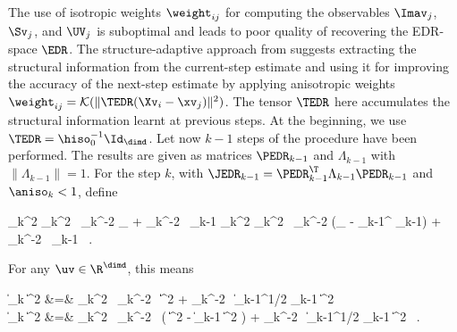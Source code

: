 \label{SEDRsa}
The use of isotropic weights \( \weight_{ij} \) for computing the observables 
\( \Imav_{j} \), \( \Sv_{j} \), and \( \UV_{j} \) is suboptimal and leads to poor 
quality of recovering the EDR-space \( \EDR \).
The structure-adaptive approach from \cite{HJPS} suggests extracting the structural information from the current-step estimate 
and using it for improving the accuracy of the next-step estimate by applying 
anisotropic weights \( \weight_{ij} = \Kern(\| \TEDR (\Xv_{i} - \xv_{j}) \|^{2}) \).
The tensor \( \TEDR \) here accumulates the structural information learnt at previous steps. 
At the beginning, we use \( \TEDR = \hiso_{0}^{-1} \Id_{\dimd} \).
Let now \( k-1 \) steps of the procedure have been performed.
The results are given as matrices \( \PEDR_{k-1} \) and \( \Lambda_{k-1} \) with \( \| \Lambda_{k-1} \| = 1 \).
For the step \( k \),
with \( \JEDR_{k-1} = \PEDR_{k-1}^{\T} \Lambda_{k-1} \PEDR_{k-1} \) and \( \aniso_{k} < 1 \), define 
\begin{EQA}[c]
	\TEDR_{k}^{2}
	\eqdef
	\aniso_{k}^{2} \, \hiso_{k}^{-2} \Id_{\dimd} + \hiso_{k}^{-2} \, \JEDR_{k-1}
	\quad
	\quad
	\TEDR_{k}^{2}
	\eqdef
	\aniso_{k}^{2} \, \hiso_{k}^{-2} (\Id_{\dimd} - \PEDR_{k-1}^{\T} \PEDR_{k-1}) + \hiso_{k}^{-2} \, \JEDR_{k-1}
	\, .
\end{EQA}
For any \( \uv \in \R^{\dimd} \), this means
\begin{EQA}[rcl]
	\| \TEDR_{k} \uv \|^{2}
	&=&
	\aniso_{k}^{2} \, \hiso_{k}^{-2} \, \| \uv \|^{2} + \hiso_{k}^{-2} \, \| \Lambda_{k-1}^{1/2} \PEDR_{k-1} \uv \|^{2}
	\\
	\quad
	\| \TEDR_{k} \uv \|^{2}
	&=&
	\aniso_{k}^{2} \, \hiso_{k}^{-2} \, \bigl( \| \uv \|^{2} - \| \PEDR_{k-1} \uv \|^{2} \bigr) 
	+ \hiso_{k}^{-2} \, \| \Lambda_{k-1}^{1/2} \PEDR_{k-1} \uv \|^{2}
	\, .
\end{EQA}
%
